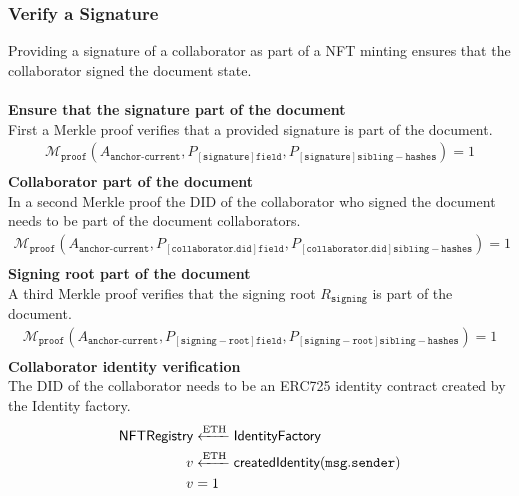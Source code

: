 \subsubsection{Verify a Signature}
Providing a signature of a collaborator as part of a NFT minting ensures that the collaborator signed the document state.\\\\
\textbf{Ensure that the signature part of the document} \\
First a Merkle proof verifies that a provided signature is part of the document.
\begin{equation}
\begin{split}
\mathcal{M}_{\texttt{proof}}(A_{\texttt{anchor-current}} ,P_{[\mathtt{signature}]\mathtt{field}},P_{[\mathtt{signature}]\mathtt{sibling-hashes}}) = 1 \\
\end{split}
\end{equation}
\textbf{Collaborator part of the document} \\
In a second Merkle proof the DID of the collaborator who signed the document needs to be part of the document collaborators.
\begin{equation}
\begin{split}
\mathcal{M}_{\texttt{proof}}(A_{\texttt{anchor-current}} ,P_{[\mathtt{collaborator.did}]\mathtt{field}},P_{[\mathtt{collaborator.did}]\mathtt{sibling-hashes}}) = 1 \\
\end{split}
\end{equation}
\textbf{Signing root part of the document} \\
A third Merkle proof verifies that the signing root $R_\mathtt{signing}$ is part of the document.
\begin{equation}
\begin{split}
\mathcal{M}_{\texttt{proof}}(A_{\texttt{anchor-current}} ,P_{[\mathtt{signing-root}]\mathtt{field}},P_{[\mathtt{signing-root}]\mathtt{sibling-hashes}}) = 1 \\
\end{split}
\end{equation}
\textbf{Collaborator identity verification} \\
The DID of the collaborator needs to be an ERC725 identity contract created by the Identity factory.
\begin{equation}
\begin{split}
\mathsf{NFTRegistry} &\xleftarrow[]{\text{ETH}}  \mathsf{IdentityFactory} \\
v &\xleftarrow[]{\text{ETH}} \textsf{createdIdentity}(\mathtt{msg.sender}) \\
v & = 1
\end{split}
\end{equation}
